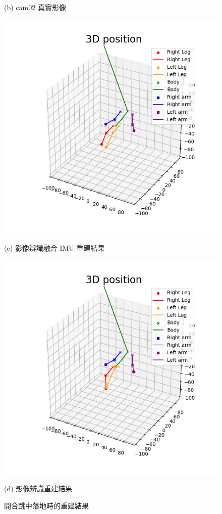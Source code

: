 \begin{figure}[!ht]
\begin{minipage}{.5\textwidth}
       \caption*{(b) cam02 真實影像}
    \end{minipage}
    \begin{minipage}{.5\textwidth}
       \centering
       \includegraphics[width=.95\linewidth]{figure/ch4_fig_jump_result_with2.png}
       \caption*{(c) 影像辨識融合 IMU 重建結果}
    \end{minipage}%
    \begin{minipage}{.5\textwidth}
       \centering
       \includegraphics[width=.95\linewidth]{figure/ch4_fig_jump_result_no2.png}
       \caption*{(d) 影像辨識重建結果}
    \end{minipage}
   \caption[開合跳中落地時的重建結果]{開合跳中落地時的重建結果}
   \label{ch4_fig_jump_stand}
\end{figure}

